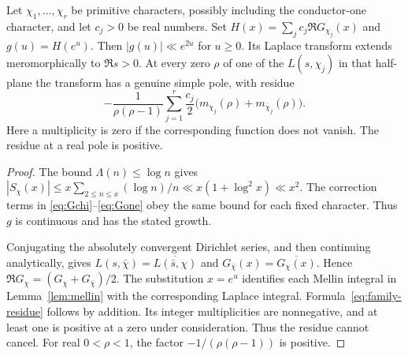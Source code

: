 \begin{lemma}\label{lem:positive-family}
Let $\chi_1,\ldots,\chi_r$ be primitive characters, possibly including
the conductor-one character, and let $c_j>0$ be real numbers.
Set $H(x)=\sum_jc_j\Re G_{\chi_j}(x)$ and $g(u)=H(e^u)$.
Then $|g(u)|\ll e^{2u}$ for $u\ge0$. Its Laplace transform extends
meromorphically to $\Re s>0$. At every zero $\rho$ of one of the
$L(s,\chi_j)$ in that half-plane the transform has a genuine simple
pole, with residue
\begin{equation}\label{eq:family-residue}
 -\frac{1}{\rho(\rho-1)}
    \sum_{j=1}^r\frac{c_j}{2}
                 \bigl(m_{\chi_j}(\rho)+m_{\bar\chi_j}(\rho)\bigr).
\end{equation}
Here a multiplicity is zero if the corresponding function does not
vanish. The residue at a real pole is positive.
\end{lemma}

\begin{proof}
The bound $\Lambda(n)\le\log n$ gives
$|S_\chi(x)|\le x\sum_{2\le n\le x}(\log n)/n
\ll x(1+\log^2x)\ll x^2$. The correction terms in
\eqref{eq:Gchi}--\eqref{eq:Gone} obey the same bound for each fixed
character. Thus $g$ is continuous and has the stated growth.

Conjugating the absolutely convergent Dirichlet series, and then
continuing analytically, gives
$L(s,\bar\chi)=\overline{L(\bar s,\chi)}$ and
$G_{\bar\chi}(x)=\overline{G_\chi(x)}$.
Hence $\Re G_\chi=(G_\chi+G_{\bar\chi})/2$.
The substitution $x=e^u$ identifies each Mellin integral in
Lemma~\ref{lem:mellin} with the corresponding Laplace integral.
Formula~\eqref{eq:family-residue} follows by addition. Its integer
multiplicities are nonnegative, and at least one is positive at a
zero under consideration. Thus the residue cannot cancel.
For real $0<\rho<1$, the factor $-1/(\rho(\rho-1))$ is positive.
\end{proof}


